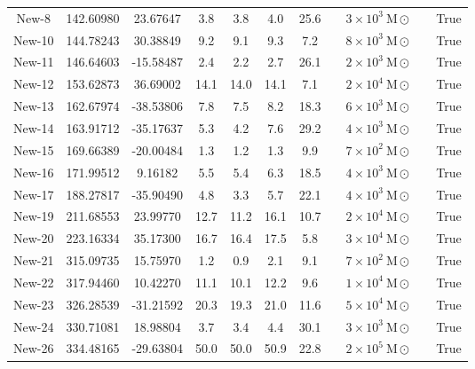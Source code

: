 \begin{table}
\begin{tabular}{ccccccccccc}
New-8 & 142.60980 & 23.67647 & 3.8 & 3.8 & 4.0 & 25.6 & \citet{ibata:2023} & $3 \times 10^{3}~\mathrm{M}\odot$ &  & True \\
New-10 & 144.78243 & 30.38849 & 9.2 & 9.1 & 9.3 & 7.2 & \citet{ibata:2023} & $8 \times 10^{3}~\mathrm{M}\odot$ &  & True \\
New-11 & 146.64603 & -15.58487 & 2.4 & 2.2 & 2.7 & 26.1 & \citet{ibata:2023} & $2 \times 10^{3}~\mathrm{M}\odot$ &  & True \\
New-12 & 153.62873 & 36.69002 & 14.1 & 14.0 & 14.1 & 7.1 & \citet{ibata:2023} & $2 \times 10^{4}~\mathrm{M}\odot$ &  & True \\
New-13 & 162.67974 & -38.53806 & 7.8 & 7.5 & 8.2 & 18.3 & \citet{ibata:2023} & $6 \times 10^{3}~\mathrm{M}\odot$ &  & True \\
New-14 & 163.91712 & -35.17637 & 5.3 & 4.2 & 7.6 & 29.2 & \citet{ibata:2023} & $4 \times 10^{3}~\mathrm{M}\odot$ &  & True \\
New-15 & 169.66389 & -20.00484 & 1.3 & 1.2 & 1.3 & 9.9 & \citet{ibata:2023} & $7 \times 10^{2}~\mathrm{M}\odot$ &  & True \\
New-16 & 171.99512 & 9.16182 & 5.5 & 5.4 & 6.3 & 18.5 & \citet{ibata:2023} & $4 \times 10^{3}~\mathrm{M}\odot$ &  & True \\
New-17 & 188.27817 & -35.90490 & 4.8 & 3.3 & 5.7 & 22.1 & \citet{ibata:2023} & $4 \times 10^{3}~\mathrm{M}\odot$ &  & True \\
New-19 & 211.68553 & 23.99770 & 12.7 & 11.2 & 16.1 & 10.7 & \citet{ibata:2023} & $2 \times 10^{4}~\mathrm{M}\odot$ &  & True \\
New-20 & 223.16334 & 35.17300 & 16.7 & 16.4 & 17.5 & 5.8 & \citet{ibata:2023} & $3 \times 10^{4}~\mathrm{M}\odot$ &  & True \\
New-21 & 315.09735 & 15.75970 & 1.2 & 0.9 & 2.1 & 9.1 & \citet{ibata:2023} & $7 \times 10^{2}~\mathrm{M}\odot$ &  & True \\
New-22 & 317.94460 & 10.42270 & 11.1 & 10.1 & 12.2 & 9.6 & \citet{ibata:2023} & $1 \times 10^{4}~\mathrm{M}\odot$ &  & True \\
New-23 & 326.28539 & -31.21592 & 20.3 & 19.3 & 21.0 & 11.6 & \citet{ibata:2023} & $5 \times 10^{4}~\mathrm{M}\odot$ &  & True \\
New-24 & 330.71081 & 18.98804 & 3.7 & 3.4 & 4.4 & 30.1 & \citet{ibata:2023} & $3 \times 10^{3}~\mathrm{M}\odot$ &  & True \\
New-26 & 334.48165 & -29.63804 & 50.0 & 50.0 & 50.9 & 22.8 & \citet{ibata:2023} & $2 \times 10^{5}~\mathrm{M}\odot$ &  & True \\

\end{tabular}
\end{table}
